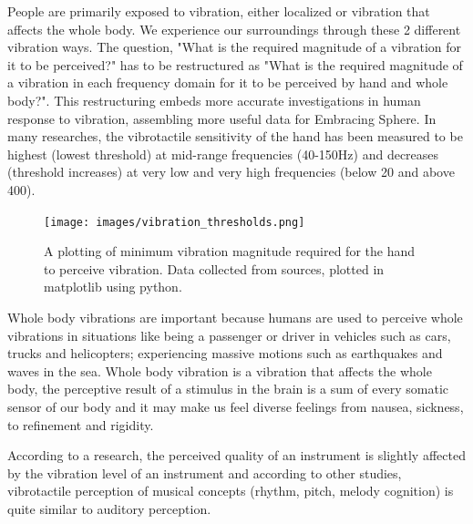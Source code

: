             People are primarily exposed to vibration, either localized or vibration that affects the whole body\cite{Human_Response_to_Vibration}. We experience our surroundings through these 2 different vibration ways. The question, "What is the required magnitude of a vibration for it to be perceived?" has to be restructured as "What is the required magnitude of a vibration in each frequency domain for it to be perceived by hand and whole body?". This restructuring embeds more accurate investigations in human response to vibration, assembling more useful data for Embracing Sphere. In many researches\cite{Human_Response_to_Vibration}\cite{Consonance_of_Vibrotactile_Chords}\cite{Threshold_of_Stimulation_Levels}\cite{Whole-Body_Vibration_Perception_Thresholds}, the vibrotactile sensitivity of the hand has been measured to be highest (lowest threshold) at mid-range frequencies (40-150Hz) and decreases (threshold increases) at very low and very high frequencies (below 20 and above 400).\par

            \begin{figure}[H]
                \centering
                \texttt{[image: images/vibration\_thresholds.png]}
                \caption{A plotting of minimum vibration magnitude required for the hand to perceive vibration. Data collected from sources\cite{Haptic_Music}\cite{Haptic_Perception-A_Tutorial}\cite{Human_Response_to_Vibration}, plotted in matplotlib using python.}
                \label{fig:VIB_THRESHOLD}
            \end{figure}

            Whole body vibrations are important because humans are used to perceive whole vibrations in situations like being a passenger or driver in vehicles such as cars, trucks and helicopters; experiencing massive motions such as earthquakes and waves in the sea\cite{Altinsoy_phd}. Whole body vibration is a vibration that affects the whole body, the perceptive result of a stimulus in the brain is a sum of every somatic sensor of our body\cite{Whole-Body_Vibration_Perception_Thresholds} and it may make us feel diverse feelings from nausea, sickness, to refinement and rigidity\cite{Haptic_Perception-A_Tutorial}.\par 

            According to a research\cite{Perceived_Quality_with_Vibration_of_Electric_Cello}, the perceived quality of an instrument is slightly affected by the vibration level of an instrument and according to other studies\cite{Consonance_of_Vibrotactile_Chords}\cite{Audio-Tactile_Rendering}, vibrotactile perception of musical concepts (rhythm, pitch, melody cognition) is quite similar to auditory perception.\par

